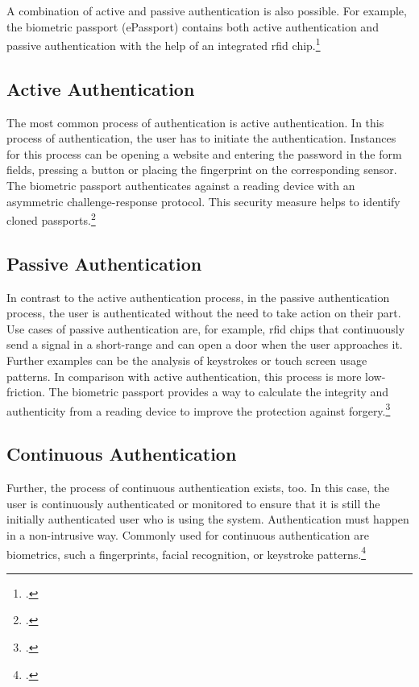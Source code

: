 A combination of active and passive authentication is also possible. For example, the biometric passport (\frqq ePassport\flqq) contains both active authentication and passive authentication with the help of an integrated \gls{rfid} chip.\footcite[See][545]{eckert-it-sec-9}


\subsection{Active Authentication}
\label{subsec:active_auth}

The most common process of authentication is active authentication. In this process of authentication, the user has to initiate the authentication. Instances for this process can be opening a website and entering the password in the form fields, pressing a button or placing the fingerprint on the corresponding sensor. The biometric passport authenticates against a reading device with an asymmetric challenge-response protocol. This security measure helps to identify cloned passports.\footcites[See][185--186]{10.1007/978-3-319-05452-0_14} [See][545]{eckert-it-sec-9}

\subsection{Passive Authentication}

In contrast to the active authentication process, in the passive authentication process, the user is authenticated without the need to take action on their part. Use cases of passive authentication are, for example, \gls{rfid} chips that continuously send a signal in a short-range and can open a door when the user approaches it. Further examples can be the analysis of keystrokes or touch screen usage patterns. In comparison with active authentication, this process is more low-friction. The biometric passport provides a way to calculate the integrity and authenticity from a reading device to improve the protection against forgery.\footcites[See][186]{10.1007/978-3-319-05452-0_14}[See][]{185306}[See][545]{eckert-it-sec-9}

\subsection{Continuous Authentication}

Further, the process of continuous authentication exists, too. In this case, the user is continuously authenticated or monitored to ensure that it is still the initially authenticated user who is using the system. Authentication must happen in a non-intrusive way. Commonly used for continuous authentication are biometrics, such a fingerprints, facial recognition, or keystroke patterns.\footcites[See][236--238]{dasgupta2017multi}[See][]{7444124}

